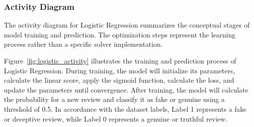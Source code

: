 \documentclass[12pt,a4paper]{report}
\begin{document}
\subsubsection*{Activity Diagram}

The activity diagram for Logistic Regression summarizes the conceptual stages of model training and prediction. The optimization steps represent the learning process rather than a specific solver implementation.

Figure~\ref{fig:logistic_activity} illustrates the training and prediction process of Logistic Regression. During training, the model will initialize its parameters, calculate the linear score, apply the sigmoid function, calculate the loss, and update the parameters until convergence. After training, the model will calculate the probability for a new review and classify it as fake or genuine using a threshold of 0.5. In accordance with the dataset labels, Label 1 represents a fake or deceptive review, while Label 0 represents a genuine or truthful review.
\end{document}
